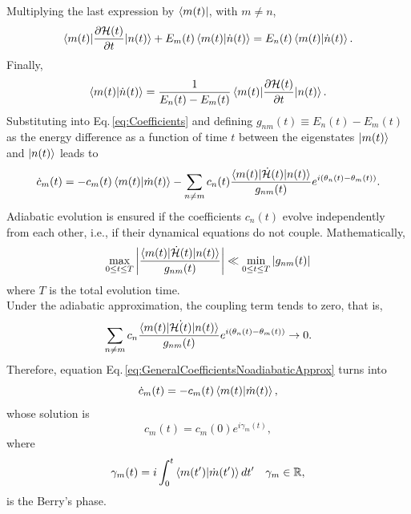 Multiplying the last expression by $\bra{m(t)}$, with $m\neq n$,
\begin{equation}
    \braket{m(t)|\frac{\partial\mathcal{H}(t)}{\partial t}|n(t)} + E_{m}(t)\braket{m(t)|\dot{n}(t)} = E_{n}(t)\braket{m(t)|\dot{n}(t)}.
\end{equation}
Finally,
\begin{equation}
    \braket{m(t)|\dot{n}(t)} = \frac{1}{E_{n}(t)-E_{m}(t)}\braket{m(t)|\frac{\partial \mathcal{H}(t)}{\partial t}|n(t)}.
\end{equation}
Substituting into Eq.\,\eqref{eq:Coefficients} and defining $g_{nm}(t)\equiv E_{n}(t) - E_{m}(t)$ as the energy difference as a function of time $t$ between the eigenstates $\ket{m(t)}$ and $\ket{n(t)}$ leads to
\begin{equation}
\label{eq:GeneralCoefficientsNoadiabaticApprox}
    \dot{c}_{m}(t) = -c_{m}(t) \braket{m(t)|\dot{m}(t)} - \sum_{n\neq m} c_{n}(t)\frac{\braket{m(t)|\dot{\mathcal{H}}(t)|n(t)}}{g_{nm}(t)}e^{i\left(\theta_{n}(t) - \theta_{m}(t)\right)}.
\end{equation}
Adiabatic evolution is ensured if the coefficients $c_{n}(t)$ evolve independently from each other, i.e., if their dynamical equations do not couple. Mathematically,
\begin{equation}
    \max_{0 \leq t \leq T} \abs{\frac{\braket{m(t)|\dot{\mathcal{H}}(t)|n(t)}}{g_{nm}(t)}} \ll \min_{0\leq t \leq T} \abs{g_{nm}(t)}
\end{equation}
where $T$ is the total evolution time.\\ 
Under the adiabatic approximation, the coupling term tends to zero, that is,
\begin{equation}
    \sum_{n\neq m} c_{n}\frac{\braket{m(t)|\dot{\mathcal{H}(t)}|n(t)}}{g_{nm}(t)}e^{i\left(\theta_{n}(t) - \theta_{m}(t)\right)} \to 0.
\end{equation}
Therefore, equation Eq.\,\eqref{eq:GeneralCoefficientsNoadiabaticApprox} turns into
\begin{equation}
    \dot{c}_{m}(t) = -c_{m}(t)\braket{m(t)|\dot{m}(t)},
\end{equation}
whose solution is
\begin{equation}
    c_{m}(t) = c_{m}(0)e^{i\gamma_{m}(t)},
\end{equation}
where
\begin{equation}
    \gamma_{m}(t) = i\int_{0}^{t}\braket{m(t^{\prime})|\dot{m}(t^{\prime})}dt^{\prime} \quad \gamma_{m}\in \mathbb{R},
\end{equation}
is the Berry's phase.
